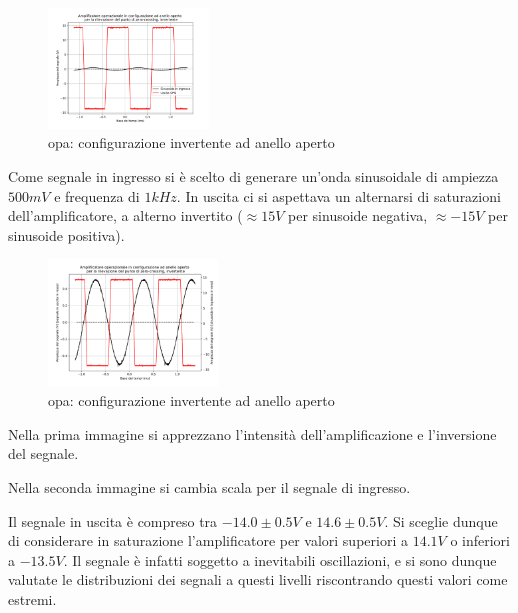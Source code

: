 \documentclass[journal]{IEEEtran}
\begin{document}
\begin{figure}[h]%
\begin {center}
\includegraphics[width=0.38\textwidth]{analysis/output/opa-open-loop-inv-zero-crossing.pdf}
\caption{opa: configurazione invertente ad anello aperto}
\label{fig:oscilloscope}
\end {center}
\end{figure}

Come segnale in ingresso si è scelto di generare un'onda sinusoidale di ampiezza $500 mV$ e frequenza di $1kHz$. In uscita ci si aspettava un alternarsi di saturazioni dell'amplificatore, a alterno invertito ($ \approx 15 V$ per sinusoide negativa, $\approx -15 V$ per sinusoide positiva).

\begin{figure}[h]%
\begin {center}
\includegraphics[width=0.40\textwidth]{analysis/output/opa-open-loop-inv-zero-crossing-z2.pdf}
\caption{opa: configurazione invertente ad anello aperto}
\label{fig:oscilloscope}
\end {center}
\end{figure}

Nella prima immagine si apprezzano l'intensità dell'amplificazione e l'inversione del segnale.

Nella seconda immagine si cambia scala per il segnale di ingresso.

Il segnale in uscita è compreso tra $-14.0 \pm 0.5 V $  e $14.6 \pm 0.5 V$.
Si sceglie dunque di considerare in saturazione l'amplificatore per valori superiori a $14.1 V$ o inferiori a $-13.5 V$. Il segnale è infatti soggetto a inevitabili
oscillazioni, e si sono dunque valutate le distribuzioni dei segnali a questi livelli riscontrando questi valori come estremi.
\end{document}

